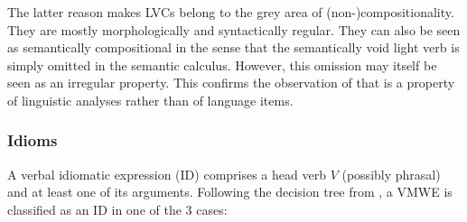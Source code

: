 \documentclass[output=paper,modfonts]{langscibook}
\begin{document}
The latter reason makes LVCs belong to the grey area of (non-)com\-po\-si\-tio\-na\-li\-ty. 
They are mostly morphologically and syntactically regular. They can also be seen as semantically %
compositional in the sense that the semantically void light verb is simply omitted in the semantic calculus. However, this omission %
may itself be seen as an irregular property. This confirms the observation of \citet{Kracht07} that  is a property of linguistic analyses rather than of language items.

\subsubsection{Idioms}
\label{sec:ids}
%
A verbal idiomatic expression (ID) comprises a head verb $V$ (possibly phrasal) and at least one of its arguments. Following the decision tree from , a VMWE is classified as an ID in one of the 3 cases:
\end{document}
